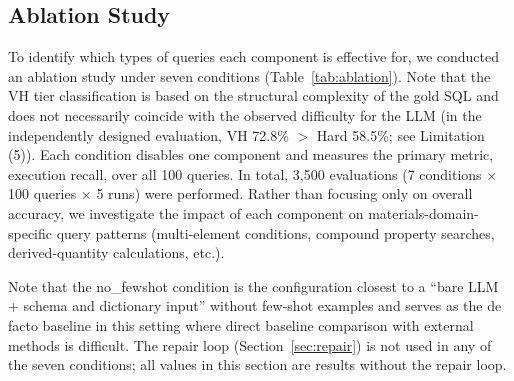 \subsection{Ablation Study}\label{sec:ablation}

To identify which types of queries each component is effective for, we conducted an ablation study under seven conditions (Table~\ref{tab:ablation}). Note that the VH tier classification is based on the structural complexity of the gold SQL and does not necessarily coincide with the observed difficulty for the LLM (in the independently designed evaluation, VH 72.8\% $>$ Hard 58.5\%; see Limitation (5)). Each condition disables one component and measures the primary metric, execution recall, over all 100 queries. In total, 3{,}500 evaluations (7 conditions $\times$ 100 queries $\times$ 5 runs) were performed. Rather than focusing only on overall accuracy, we investigate the impact of each component on materials-domain-specific query patterns (multi-element conditions, compound property searches, derived-quantity calculations, etc.).

Note that the no\_fewshot condition is the configuration closest to a ``bare LLM + schema and dictionary input'' without few-shot examples and serves as the de facto baseline in this setting where direct baseline comparison with external methods is difficult. The repair loop (Section~\ref{sec:repair}) is not used in any of the seven conditions; all values in this section are results without the repair loop.

